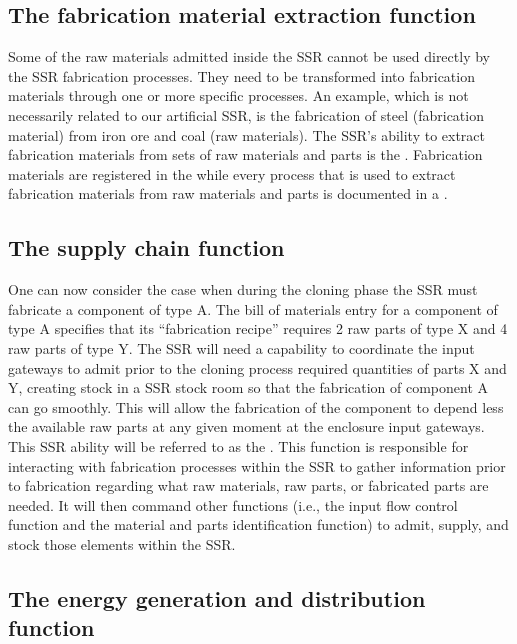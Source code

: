\subsection[The fabrication material extraction function]{The fabrication material extraction function}

Some of the raw materials
admitted inside the SSR cannot be used directly by the SSR fabrication
processes. They need to be transformed into fabrication materials
through one or more specific processes. An example, which is not necessarily
related to our artificial SSR, is the fabrication
of steel (fabrication material) from iron ore and coal (raw materials). The SSR's ability to
extract fabrication materials from sets of raw materials and parts is
the .  Fabrication
materials are registered in the  
while every process that is used
to extract fabrication materials from raw materials and parts is
documented in a .

\subsection[The supply chain function]{The supply chain function}

One can now consider the case when during the
cloning phase the SSR must fabricate a component of type A.  The bill
of materials entry for a component of type A specifies that its
“fabrication recipe” requires 2 raw parts of type X and 4 raw parts of
type Y.  The SSR will need a capability to coordinate the input
gateways to admit prior to the cloning process required quantities of parts X and Y,
creating stock in a SSR stock room so that the fabrication of
component A can go smoothly.  This will allow the fabrication of the component to depend less 
the available raw parts at any given moment at the enclosure input
gateways. This SSR ability will be referred to as the . 
This function is responsible for interacting with
fabrication processes within the SSR to gather information prior to
fabrication regarding what raw materials, raw parts, or fabricated
parts are needed. It will then command other functions (i.e., the input flow control function 
and the material and parts identification function) to admit, supply, and stock
those elements within the SSR.

\subsection[The energy generation and distribution function]{The energy generation and distribution function}

